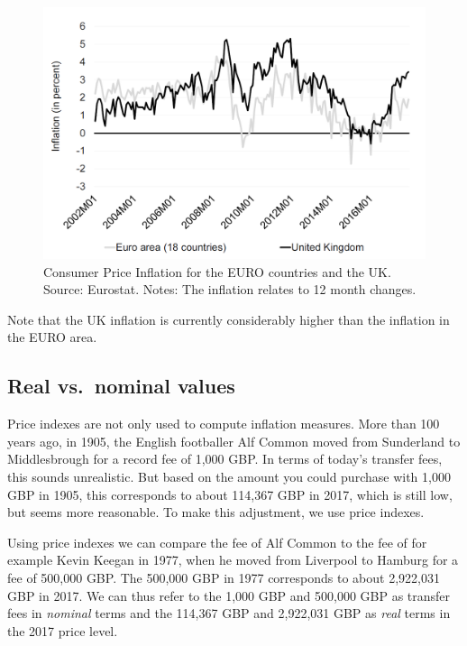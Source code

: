 \documentclass[]{book}
\begin{document}
\begin{figure}

{\centering \includegraphics[width=0.75\linewidth]{_resources/chapter_prices/ex1_2} 

}

\caption{Consumer Price Inflation for the EURO countries and the UK. {Source: Eurostat. Notes: The inflation relates to 12 month changes.}}\label{fig:pricefig2}
\end{figure}

Note that the UK inflation is currently considerably higher than the inflation in the EURO area.

\hypertarget{real-vs.-nominal-values}{%
\subsection{Real vs.~nominal values}\label{real-vs.-nominal-values}}

Price indexes are not only used to compute inflation measures. More than 100 years ago, in 1905, the English footballer Alf Common moved from Sunderland to Middlesbrough for a record fee of 1,000 GBP. In terms of today's transfer fees, this sounds unrealistic. But based on the amount you could purchase with 1,000 GBP in 1905, this corresponds to about 114,367 GBP in 2017, which is still low, but seems more reasonable. To make this adjustment, we use price indexes.

Using price indexes we can compare the fee of Alf Common to the fee of for example Kevin Keegan in 1977, when he moved from Liverpool to Hamburg for a fee of 500,000 GBP. The 500,000 GBP in 1977 corresponds to about 2,922,031 GBP in 2017. We can thus refer to the 1,000 GBP and 500,000 GBP as transfer fees in \emph{nominal} terms and the 114,367 GBP and 2,922,031 GBP as \emph{real} terms in the 2017 price level.
\end{document}
